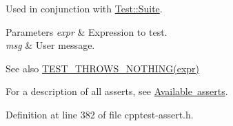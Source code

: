 Used in conjunction with \mbox{\hyperlink{class_test_1_1_suite}{Test\+::\+Suite}}.


\begin{DoxyParams}{Parameters}
{\em expr} & Expression to test. \\
\hline
{\em msg} & User message.\\
\hline
\end{DoxyParams}
\begin{DoxySeeAlso}{See also}
\mbox{\hyperlink{cpptest-assert_8h_a885a5f6b6decac47414b4cc1a0a66425}{T\+E\+S\+T\+\_\+\+T\+H\+R\+O\+W\+S\+\_\+\+N\+O\+T\+H\+I\+N\+G(expr)}}
\end{DoxySeeAlso}
For a description of all asserts, see \mbox{\hyperlink{asserts}{Available asserts}}. 

Definition at line 382 of file cpptest-\/assert.\+h.


